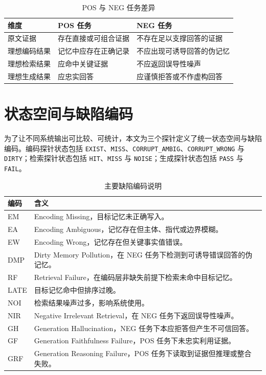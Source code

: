 \begin{table}[htbp]
\centering
\caption{POS 与 NEG 任务差异}
\label{tab:pos-neg}
\begin{tabular}{p{}p{}p{}}
\toprule
维度 & POS 任务 & NEG 任务 \\
\midrule
原文证据 & 存在直接或可组合证据 & 不存在足以支撑回答的证据 \\
理想编码结果 & 记忆中应存在正确记录 & 不应出现可诱导回答的伪记忆 \\
理想检索结果 & 应命中关键证据 & 不应返回误导性噪声 \\
理想生成结果 & 应忠实回答 & 应谨慎拒答或不作虚构回答 \\
\bottomrule
\end{tabular}
\end{table}

\section{状态空间与缺陷编码}

为了让不同系统输出可比较、可统计，本文为三个探针定义了统一状态空间与缺陷编码。编码探针状态包括 \texttt{EXIST}、\texttt{MISS}、\texttt{CORRUPT\_AMBIG}、\texttt{CORRUPT\_WRONG} 与 \texttt{DIRTY}；检索探针状态包括 \texttt{HIT}、\texttt{MISS} 与 \texttt{NOISE}；生成探针状态包括 \texttt{PASS} 与 \texttt{FAIL}。

\begin{table}[htbp]
\centering
\caption{主要缺陷编码说明}
\label{tab:defects}
\begin{tabular}{p{}p{}}
\toprule
编码 & 含义 \\
\midrule
EM & Encoding Missing，目标记忆未正确写入。 \\
EA & Encoding Ambiguous，记忆存在但主体、指代或边界模糊。 \\
EW & Encoding Wrong，记忆存在但关键事实值错误。 \\
DMP & Dirty Memory Pollution，在 NEG 任务下检测到可诱导错误回答的伪记忆。 \\
RF & Retrieval Failure，在编码层非缺失前提下检索未命中目标记忆。 \\
LATE & 目标记忆命中但排序过晚。 \\
NOI & 检索结果噪声过多，影响系统使用。 \\
NIR & Negative Irrelevant Retrieval，在 NEG 任务下返回误导性噪声。 \\
GH & Generation Hallucination，NEG 任务下本应拒答但产生不可信回答。 \\
GF & Generation Faithfulness Failure，POS 任务下未忠实利用证据。 \\
GRF & Generation Reasoning Failure，POS 任务下读取到证据但推理或整合失败。 \\
\bottomrule
\end{tabular}
\end{table}

